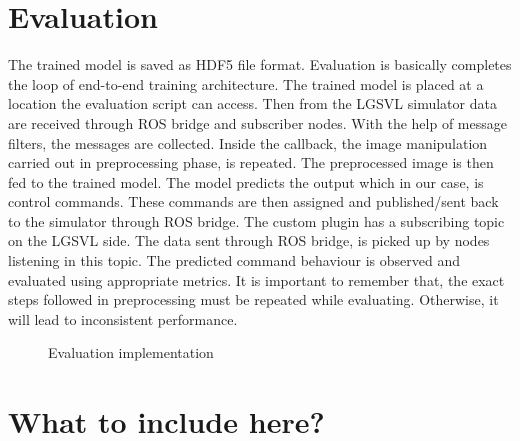 \section{Evaluation}
The trained model is saved as HDF5 file format. Evaluation is basically completes the loop
of end-to-end training architecture. The trained model is placed at a location the
evaluation script can access. Then from the LGSVL simulator data are received through ROS
bridge and subscriber nodes. With the help of message filters, the messages are collected.
Inside the callback, the image manipulation carried out in preprocessing phase, is
repeated. The preprocessed image is then fed to the trained model. The model predicts the
output which in our case, is control commands. These commands are then assigned and published/sent
back to the simulator through ROS bridge. The custom plugin has a subscribing topic on the
LGSVL side. The data sent through ROS bridge, is picked up by nodes listening in this topic. The predicted command behaviour is observed and
evaluated using appropriate metrics. It is important to remember that, the exact steps followed
in preprocessing must be repeated while evaluating. Otherwise, it will lead to inconsistent
performance.

\begin{figure}
	\centering
    \def\svgwidth{1.05\textwidth}
    \caption{Evaluation implementation}
    \label{fig:evaluationfigure}
\end{figure}

\iffalse
\section{What to include here?}

